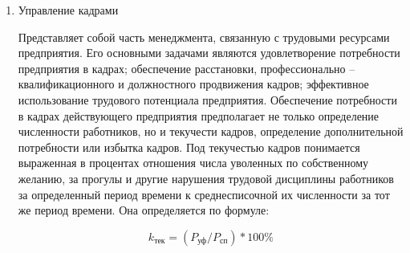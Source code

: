 \documentclass[11pt]{article}
\begin{document}
\begin{enumerate}
\item Управление кадрами
\label{sec:org9289d13}

Представляет собой часть менеджмента, связанную с трудовыми ресурсами
предприятия. Его основными задачами являются удовлетворение потребности
предприятия в кадрах; обеспечение расстановки, профессионально – квалификационного
и должностного продвижения кадров; эффективное использование трудового потенциала
предприятия.
Обеспечение потребности в кадрах действующего предприятия предполагает не
только определение численности работников, но и текучести кадров, определение
дополнительной потребности или избытка кадров.
Под текучестью кадров понимается выраженная в процентах отношения числа
уволенных по собственному желанию, за прогулы и другие нарушения трудовой
дисциплины работников за определенный период времени к среднесписочной их
численности за тот же период времени. Она определяется по формуле:

\begin{equation}
k_{\text{тек}} = (P_{\text{уф}}/P_{\text{сп}})*100\%  
\end{equation}
\end{enumerate}
\end{document}
